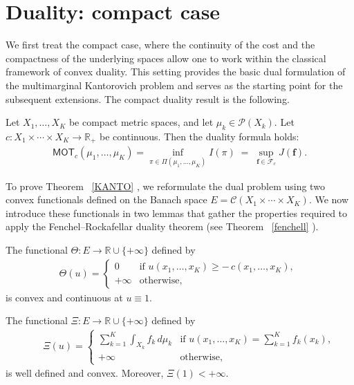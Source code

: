 \documentclass[twoside,11pt,a4paper]{article}
\newcommand*{\SavedRef}{}
\let\SavedRef\ref
\renewcommand*{\ref}[1]{  \begingroup
    \hypersetup{
      linkcolor=linkequation,
      linkbordercolor=linkequation,
    }    \SavedRef{#1}  \endgroup
}
\begin{document}
\section{Duality: compact case}\label{secdual}

We first treat the compact case, where the continuity of the cost and the compactness of the underlying spaces allow one to work within the classical framework of convex duality. This setting provides the basic dual formulation of the multimarginal Kantorovich problem and serves as the starting point for the subsequent extensions. The compact duality result is the following.


\begin{theorem}\label{KANTO}
Let $X_1,\ldots,X_K$ be compact metric spaces, and let $\mu_k\in\mathcal{P}(X_k)$.
Let $c : X_1 \times \cdots \times X_K \to \mathbb{R}_+$ be continuous. Then the duality formula holds:
\begin{align*}
\mathsf{MOT}_c(\mu_1,\ldots,\mu_K)
=\inf_{\pi\in\Pi(\mu_1,\dots,\mu_K)} I(\pi)
\;=\;
\sup_{\boldsymbol{f}\in \mathcal{F}_c} J(\boldsymbol{f}).
\end{align*}
\end{theorem}

To prove Theorem~\ref{KANTO}, we reformulate the dual problem using two convex 
functionals defined on the Banach space $E = \mathcal{C}(X_1 \times \cdots \times X_K)$. We now introduce these functionals in two lemmas that gather the properties
required to apply the Fenchel--Rockafellar duality theorem (see Theorem~\ref{fenchell}). 


\begin{lemma}\label{Theta}
The functional $\Theta : E \longrightarrow \mathbb{R}\cup\{+\infty\}$ defined by
\begin{align*}
\Theta(u)=
\begin{cases}
0 & \text{if } u(x_1,\ldots,x_K)\ge -\,c(x_1,\ldots,x_K),\ \\[1mm]
+\infty & \text{otherwise,}
\end{cases}
\end{align*}
is convex and continuous at $u\equiv 1$.
\end{lemma}

\begin{lemma}\label{Xi}
The functional $\Xi:E\to\mathbb{R}\cup\{+\infty\}$ defined by
\begin{align*}
\qquad
\Xi(u)=
\begin{cases}
\displaystyle \sum_{k=1}^{K} \int_{X_k}f_k\,d\mu_k
& \text{if } u(x_1,\ldots,x_K)=\sum_{k=1}^{K} f_k(x_k),\\[2mm]
+\infty & \text{otherwise,}
\end{cases}
\end{align*}
is well defined and convex. Moreover, $\Xi(1)<+\infty$.
\end{lemma}
\end{document}
